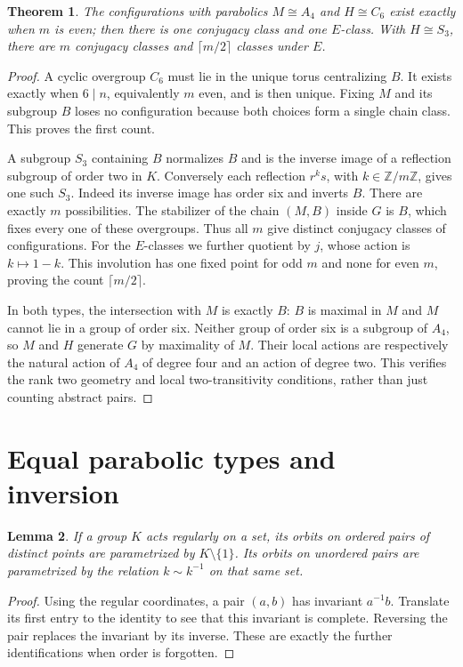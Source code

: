 \documentclass[11pt]{article}
\newtheorem{lemma}{Lemma}
\newtheorem{theorem}[lemma]{Theorem}
\begin{document}
\begin{theorem}\label{different}
The configurations with parabolics $M\cong A_4$ and $H\cong C_6$
exist exactly when $m$ is even; then there is one conjugacy class
and one $E$-class. With $H\cong S_3$, there are $m$ conjugacy
classes and $\lceil m/2\rceil$ classes under $E$.
\end{theorem}
\begin{proof}
A cyclic overgroup $C_6$ must lie in the unique torus centralizing
$B$. It exists exactly when $6\mid n$, equivalently $m$ even,
and is then unique. Fixing $M$ and its subgroup $B$ loses no
configuration because both choices form a single chain class.
This proves the first count.

A subgroup $S_3$ containing $B$ normalizes $B$ and is the inverse
image of a reflection subgroup of order two in $K$. Conversely each
reflection $r^k s$, with $k\in\mathbb Z/m\mathbb Z$, gives one
such $S_3$. Indeed its inverse image has order six and inverts $B$.
There are exactly $m$ possibilities. The stabilizer of the chain
$(M,B)$ inside $G$ is $B$, which fixes every one of these overgroups.
Thus all $m$ give distinct conjugacy classes of configurations.
For the $E$-classes we further quotient by $j$, whose action is
$k\mapsto1-k$. This involution has one fixed point for odd $m$
and none for even $m$, proving the count $\lceil m/2\rceil$.

In both types, the intersection with $M$ is exactly $B$:
$B$ is maximal in $M$ and $M$ cannot lie in a group of order six.
Neither group of order six is a subgroup of $A_4$, so $M$ and $H$
generate $G$ by maximality of $M$. Their local actions are
respectively the natural action of $A_4$ of degree four and an
action of degree two. This verifies the rank two geometry and local
two-transitivity conditions, rather than just counting abstract pairs.
\end{proof}

\section{Equal parabolic types and inversion}
\begin{lemma}\label{inversion}
If a group $K$ acts regularly on a set, its orbits on ordered pairs
of distinct points are parametrized by $K\setminus\{1\}$.
Its orbits on unordered pairs are parametrized by the relation
$k\sim k^{-1}$ on that same set.
\end{lemma}
\begin{proof}
Using the regular coordinates, a pair $(a,b)$ has invariant
$a^{-1}b$. Translate its first entry to the identity to see that
this invariant is complete. Reversing the pair replaces the invariant
by its inverse. These are exactly the further identifications when
order is forgotten.
\end{proof}
\end{document}
